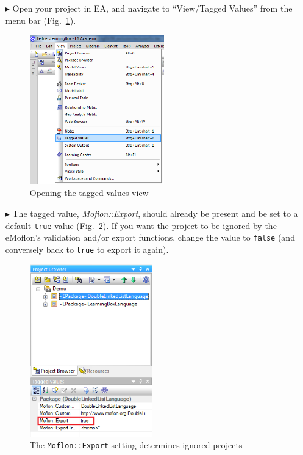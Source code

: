 \begin{enumerate}

\item[$\blacktriangleright$] Open your project in EA, and navigate to ``View/Tagged Values'' from the menu bar (Fig.~\ref{ea:view/Taggedvalues}).

\begin{figure}[htbp]
\begin{center}  \includegraphics[width=0.55\textwidth]{ea_viewTaggedValues}
  \caption{Opening the tagged values view}  
  \label{ea:view/Taggedvalues}
\end{center}
\end{figure} 

\item[$\blacktriangleright$] The tagged value, \emph{Moflon::Export}, should already be present and be set to a default \texttt{true} value
(Fig.~\ref{ea:moflonExportTG}). If you want the project to be ignored by the eMoflon's validation and/or export functions, change the value to
\texttt{false} (and conversely back to \texttt{true} to export it again).

\begin{figure}[htbp]
\begin{center}
\includegraphics[width=0.5\textwidth]{ea_moflonExportTG}
  \caption{The \texttt{Moflon::Export} setting determines ignored projects}  
  \label{ea:moflonExportTG}
\end{center}
\end{figure}

\end{enumerate}
